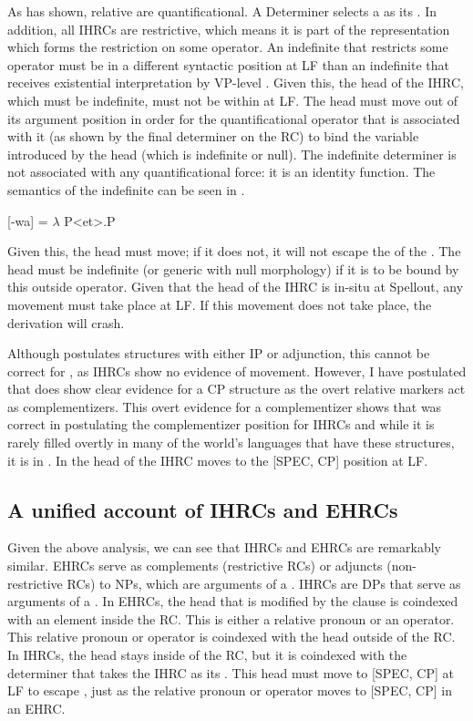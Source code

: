 \documentclass[output=paper]{LSP/langsci}
\begin{document}
As \citet{Basilico1996} has shown, relative  are quantificational. A Determiner selects a  as its . In addition, all IHRCs are restrictive, which means it is part of the representation which forms the restriction on some operator. An indefinite that restricts some operator must be in a different syntactic position at LF than an indefinite that receives existential interpretation by VP-level . Given this, the head of the IHRC, which must be indefinite, must not be within  at LF. The head must move out of its argument position in order for the quantificational operator that is associated with it (as shown by the final determiner on the RC) to bind the variable introduced by the head (which is indefinite or null). The indefinite determiner is not associated with any quantificational force: it is an identity function. The semantics of the  indefinite can be seen in .

\ea \label{boyle48}
 [-wa] = $\lambda$ P<et>.P
\z
	
Given this, the head must move; if it does not, it will not escape the  of the . The head must be indefinite (or generic with null morphology) if it is to be bound by this outside operator. Given that the head of the IHRC is in-situ at Spellout, any movement must take place at LF. If this movement does not take place, the derivation will crash.
	
Although \citet{Basilico1996} postulates structures with either IP or  adjunction, this cannot be correct for , as IHRCs show no evidence of movement. However, I have postulated that  does show clear evidence for a CP structure as the overt relative markers act as complementizers. This overt evidence for a complementizer shows that \citet{Culy1990} was correct in postulating the complementizer position for IHRCs and while it is rarely filled overtly in many of the world's languages that have these structures, it is in . In  the head of the IHRC moves to the [SPEC, CP] position at LF.

\subsection{A unified account of IHRCs and EHRCs}\label{sec:boyle:6.5}

Given the above analysis, we can see that IHRCs and EHRCs are remarkably similar. EHRCs serve as complements (restrictive RCs) or adjuncts (non-restrictive RCs) to NPs, which are arguments of a . IHRCs are DPs that serve as arguments of a . In EHRCs, the head that is modified by the clause is coindexed with an element inside the RC. This is either a relative pronoun or an operator. This relative pronoun or operator is coindexed with the head outside of the RC. In IHRCs, the head stays inside of the RC, but it is coindexed with the determiner that takes the IHRC as its . This head must move to [SPEC, CP] at LF to escape , just as the relative pronoun or operator moves to [SPEC, CP] in an EHRC.
\end{document}
